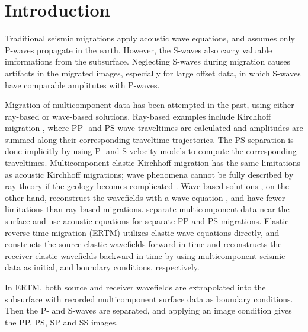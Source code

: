\documentclass[manuscript,ulem,graphix,revised]{geophysics}
\begin{document}
\section{Introduction}
Traditional seismic migrations apply acoustic wave equations, and assumes only P-waves propagate in the earth. However, the S-waves also carry valuable imformations from the subsurface. Neglecting S-waves during migration causes artifacts in the migrated images, especially for large offset data, in which S-waves have comparable amplitutes with P-waves. 


Migration of multicomponent data has been attempted in the past, using either ray-based or wave-based solutions. Ray-based examples include Kirchhoff migration \citep{kuo84, dai86, hokstad00}, where PP- and PS-wave traveltimes are calculated and amplitudes are summed along their corresponding traveltime trajectories. The PS separation is done implicitly by using P- and S-velocity models to compute the corresponding traveltimes. Multicomponent elastic Kirchhoff migration has the same limitations as acoustic Kirchhoff migrations; wave phenomena cannot be fully described by ray theory if the geology becomes complicated \citep{gray01}. Wave-based solutions \citep{chang86,chang94,whitmore95}, on the other hand, reconstruct the wavefields with a wave equation \citep{wapenaar90}, and have fewer limitations than ray-based migrations. \citet{sun01} separate multicomponent data near the surface and use acoustic equations for separate PP and PS migrations. Elastic reverse time migration (ERTM) utilizes elastic wave equations directly, and constructs the source elastic wavefields forward in time and reconstructs the receiver elastic wavefields backward in time by using multicomponent seismic data as initial, and boundary conditions, respectively.

In ERTM, both source and receiver wavefields are extrapolated into the subsurface with recorded multicomponent surface data as boundary conditions. Then the P- and S-waves are separated, and applying an image condition gives the PP, PS, SP and SS images.
\end{document}
